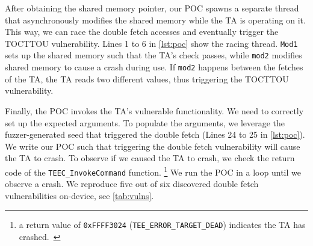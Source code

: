 \documentclass[conference]{IEEEtran} %
\newcommand{\teegris}{TEEGris\xspace}
\newcommand{\numvulns}{six\xspace}
\newcommand{\numvulnsrepro}{five\xspace}
\begin{document}



After obtaining the shared memory pointer, 
our POC spawns a separate thread that asynchronously modifies the shared 
memory while the TA is operating on it. This way, we can race the 
double fetch accesses and eventually trigger the TOCTTOU vulnerability. 
Lines 1 to 6 in \autoref{lst:poc} show the racing thread. \texttt{Mod1} sets up the shared memory such that the TA's 
check passes, while \texttt{mod2} modifies shared memory to cause a crash during use.
If \texttt{mod2} happens between 
the fetches of the TA, the TA reads two different values, thus triggering 
the TOCTTOU vulnerability.

Finally, the POC invokes the TA's vulnerable functionality. We need to correctly 
set up the expected arguments. To populate the arguments, we leverage the fuzzer-generated 
seed that triggered the double fetch (Lines 24 to 25 in \autoref{lst:poc}).
We write our POC such that triggering the double fetch vulnerability will 
cause the TA to crash. To observe if we caused the TA to crash, we check the 
return code of the \texttt{TEEC\_InvokeCommand} function. \footnote{a return value of \texttt{0xFFFF3024} (\texttt{TEE\_ERROR\_TARGET\_DEAD}) indicates the TA has crashed.~\cite{gpintapi}}
We run the POC in a loop until we observe a crash. 
We reproduce \numvulnsrepro{} out of \numvulns{} discovered 
double fetch vulnerabilities on-device, see \autoref{tab:vulns}.
\end{document}
